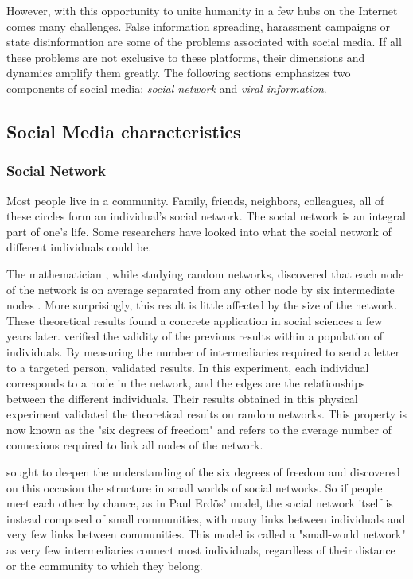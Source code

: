 However, with this opportunity to unite humanity in a few hubs on the Internet comes many challenges.
False information spreading, harassment campaigns or state disinformation are some of the problems associated with social media.
If all these problems are not exclusive to these platforms, their dimensions and dynamics amplify them greatly.
The following sections emphasizes two components of social media: \emph{social network} and \emph{viral information}.

\subsection{Social Media characteristics}
\subsubsection{Social Network}
Most people live in a community.
Family, friends, neighbors, colleagues, all of these circles form an individual's social network.
The social network is an integral part of one's life.
Some researchers have looked into what the social network of different individuals could be.

The mathematician \citeauthor{erdosEvolutionRandomGraphs1960}, while studying random networks, discovered that each node of the network is on average separated from any other node by six intermediate nodes \parencite{erdosEvolutionRandomGraphs1960}.
More surprisingly, this result is little affected by the size of the network.
These theoretical results found a concrete application in social sciences a few years later.
\textcite{milgramSmallWorldProblem1967} verified the validity of the previous results within a population of individuals.
By measuring the number of intermediaries required to send a letter to a targeted person, \citeauthor{milgramSmallWorldProblem1967} validated \citeauthor{erdosEvolutionRandomGraphs1960} results.
In this experiment, each individual corresponds to a node in the network, and the edges are the relationships between the different individuals.
Their results obtained in this physical experiment validated the theoretical results on random networks.
This property is now known as the "six degrees of freedom" and refers to the average number of connexions required to link all nodes of the network.

\textcite{wattsCollectiveDynamicsSmallworld1998} sought to deepen the understanding of the six degrees of freedom and discovered on this occasion the structure in small worlds of social networks.
So if people meet each other by chance, as in Paul Erdös' model, the social network itself is instead composed of small communities, with many links between individuals
and very few links between communities.
This model is called a "small-world network" as very few intermediaries connect most individuals, regardless of their distance or the community to which they belong.

